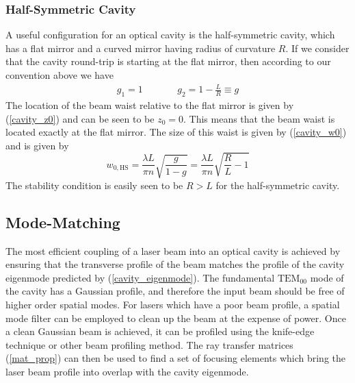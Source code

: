\subsubsection{Half-Symmetric Cavity}
A useful configuration for an optical cavity is the half-symmetric cavity, which has a flat mirror and a curved mirror having radius of curvature $R$. If we consider that the cavity round-trip is starting at the flat mirror, then according to our convention above we have
\begin{eqnarray}
	g_1 = 1 &\qquad& g_2 = 1 - \frac{L}{R} \equiv g
\end{eqnarray}
The location of the beam waist relative to the flat mirror is given by (\ref{cavity_z0}) and can be seen to be $z_0=0$. This means that the beam waist is located exactly at the flat mirror. The size of this waist is given by (\ref{cavity_w0}) and is given by
\begin{equation} \label{cavity_waste_size_half-sym}
	w_{0,\mathrm{HS}} = \frac{\lambda L}{\pi n}\sqrt{\frac{g}{1-g}}
	= \frac{\lambda L}{\pi n}\sqrt{\frac{R}{L}-1}
\end{equation}
The stability condition is easily seen to be $R > L$ for the half-symmetric cavity.

\subsection{Mode-Matching} \label{sec:mode-matching}
The most efficient coupling of a laser beam into an optical cavity is achieved by ensuring that the transverse profile of the beam matches the profile of the cavity eigenmode predicted by (\ref{cavity_eigenmode}). The fundamental $\mathrm{TEM}_{00}$ mode of the cavity has a Gaussian profile, and therefore the input beam should be free of higher order spatial modes. For lasers which have a poor beam profile, a spatial mode filter can be employed to clean up the beam at the expense of power. Once a clean Gaussian beam is achieved, it can be profiled using the knife-edge technique \cite{book_gaussBeams_AtomsMolsOpticalPhys2} or other beam profiling method. The ray transfer matrices (\ref{mat_prop}) can then be used to find a set of focusing elements which bring the laser beam profile into overlap with the cavity eigenmode.

